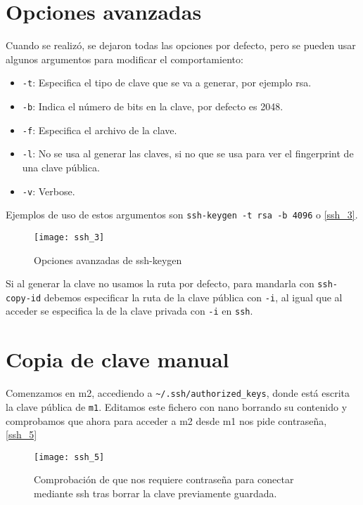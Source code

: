 \section{Opciones avanzadas}

Cuando se realizó, se dejaron todas las opciones por defecto, pero se pueden usar algunos argumentos para modificar el comportamiento:

\begin{itemize}
\item \verb|-t|: Especifica el tipo de clave que se va a generar, por ejemplo rsa.
\item \verb|-b|: Indica el número de bits en la clave, por defecto es 2048.
\item \verb|-f|: Especifica el archivo de la clave.
\item \verb|-l|: No se usa al generar las claves, si no que se usa para ver el fingerprint de una clave pública.
\item \verb|-v|: Verbose.
\end{itemize}

Ejemplos de uso de estos argumentos son \verb|ssh-keygen -t rsa -b 4096| o \eqref{ssh_3}.

\begin{figure}
\begin{center}
\caption{Opciones avanzadas de ssh-keygen}
\label{ssh_3}
\texttt{[image: ssh\_3]}
\end{center}
\end{figure}

Si al generar la clave no usamos la ruta por defecto, para mandarla con \verb|ssh-copy-id| debemos especificar la ruta de la clave pública con \verb|-i|, al igual que al acceder se especifica la de la clave privada con \verb|-i| en \verb|ssh|.

\section{Copia de clave manual}

Comenzamos en m2, accediendo a \verb|~/.ssh/authorized_keys|, donde está escrita la clave pública de \verb|m1|. Editamos este fichero con nano borrando su contenido y comprobamos que ahora para acceder a m2 desde m1 nos pide contraseña, \eqref{ssh_5}

\begin{figure}
\begin{center}
\caption{Comprobación de que nos requiere contraseña para conectar mediante ssh tras borrar la clave previamente guardada.}
\label{ssh_5}
\texttt{[image: ssh\_5]}
\end{center}
\end{figure}

